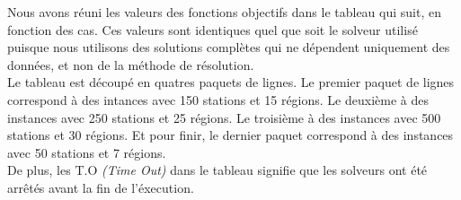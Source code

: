 \documentclass[a4paper, 10pt]{article}
\begin{document}
        Nous avons réuni les valeurs des fonctions objectifs dans le tableau qui suit, en fonction des cas. Ces valeurs sont identiques quel que soit le solveur utilisé puisque nous utilisons des solutions complètes qui ne dépendent uniquement des données, et non de la méthode de résolution. \\
        Le tableau est découpé en quatres paquets de lignes. Le premier paquet de lignes correspond à des intances avec 150 stations et 15 régions. Le deuxième à des instances avec 250 stations et 25 régions. Le troisième à des instances avec 500 stations et 30 régions. Et pour finir, le dernier paquet correspond à des instances avec 50 stations et 7 régions. \\
        De plus, les \textcolor[gray]{0.6}{T.O} \textit{(Time Out)} dans le tableau signifie que les solveurs ont été arrêtés avant la fin de l'éxecution.
\end{document}
